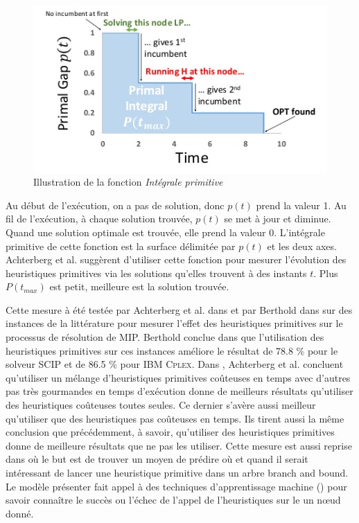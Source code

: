 \documentclass[12pt,a4paper,oneside]{book}
\theoremstyle{definition}
\begin{document}
	\begin{figure}[H]
		\centering
		\includegraphics[width=0.7\linewidth]{primal_integral}
		\caption{Illustration de la fonction \textit{Intégrale primitive}}
		\label{fig:primalintegral}
	\end{figure}
	Au début de l'exécution, on a pas de solution, donc $p(t)$ prend la valeur 1. Au fil de l'exécution, à chaque solution trouvée, $p(t)$ se met à jour et diminue. Quand une solution optimale est trouvée, elle prend la valeur 0. L'intégrale primitive de cette fonction est la surface délimitée par $p(t)$ et les deux axes. Achterberg et al. \cite{Achterberg2012} suggèrent d'utiliser cette fonction pour mesurer l'évolution des heuristiques primitives via les solutions qu'elles trouvent à des instants $t$. Plus $P(t_{max}) $ est petit, meilleure est la solution trouvée. 
	
	Cette mesure à été testée par Achterberg et al. dans \cite{Achterberg2012} et par Berthold dans \cite{Berthold2013} sur des instances de la littérature pour mesurer l'effet des heuristiques primitives sur le processus de résolution de MIP. Berthold conclue dans \cite{Berthold2013} que l'utilisation des heuristiques primitives sur ces instances améliore le résultat de 78.8 \% pour le solveur SCIP et de 86.5 \% pour IBM \textsc{Cplex}. Dans \cite{Achterberg2012}, Achterberg et al. concluent qu'utiliser un mélange d'heuristiques primitives coûteuses en temps avec d'autres pas très gourmandes en temps d'exécution donne de meilleurs résultats qu'utiliser des heuristiques coûteuses toutes seules. Ce dernier s'avère aussi meilleur qu'utiliser que des heuristiques pas coûteuses en temps. Ils tirent aussi la même conclusion que précédemment, à savoir, qu'utiliser des heuristiques primitives donne de meilleure résultats que ne pas les utiliser. Cette mesure est aussi reprise dans \cite{Khalil2017} où le but est de trouver un moyen de prédire où et quand il serait intéressant de lancer une heuristique primitive dans un arbre branch and bound. Le modèle présenter fait appel à des techniques d'apprentissage machine () pour savoir connaître le succès ou l'échec de l'appel de l'heuristiques sur le un nœud donné.
	     
\end{document}
